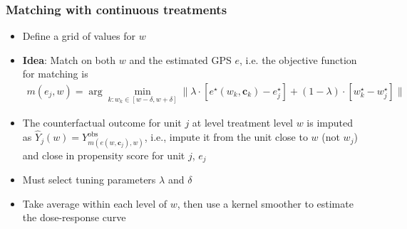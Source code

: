 
\begin{frame}
  \frametitle{Matching with continuous treatments}
  
  \begin{itemize}
  \item Define a grid of values for $w$ \medskip 
  \item \textbf{Idea}: Match on both $w$ and the estimated GPS $e$,
    i.e. the objective function for matching is
    \begin{align*}
      m(e_j, w) = \arg \min_{k: w_k \in [w - \delta, w + \delta]}
      \| \lambda \cdot [e^\star(w_k, \mathbf{c}_k) - e^\star_j] +
      (1-\lambda) \cdot [w^\star_k - w^\star_j]\|
    \end{align*}
  \item The counterfactual outcome for unit $j$ at level treatment
    level $w$ is imputed as
    $\hat Y_j(w) = Y^{\text{obs}}_{m(e(w, \mathbf{c}_j), w)}$, i.e.,
    impute it from the unit close to $w$ (not $w_j$) and close in
    propensity score for unit $j$, $e_j$ \medskip
  \item Must select tuning parameters $\lambda$ and $\delta$ \medskip 
  \item Take average within each level of $w$, then use a kernel
    smoother to estimate the dose-response curve
  \end{itemize}


  
\end{frame}



